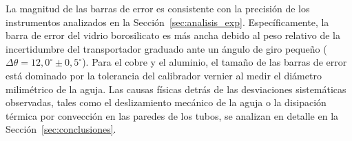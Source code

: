 La magnitud de las barras de error es consistente con la precisión de los instrumentos analizados en la Sección~\ref{sec:analisis_exp}. Específicamente, la barra de error del vidrio borosilicato es más ancha debido al peso relativo de la incertidumbre del transportador graduado ante un ángulo de giro pequeño ($\Delta\theta = 12,0^\circ \pm 0,5^\circ$). Para el cobre y el aluminio, el tamaño de las barras de error está dominado por la tolerancia del calibrador vernier al medir el diámetro milimétrico de la aguja. Las causas físicas detrás de las desviaciones sistemáticas observadas, tales como el deslizamiento mecánico de la aguja o la disipación térmica por convección en las paredes de los tubos, se analizan en detalle en la Sección~\ref{sec:conclusiones}. 